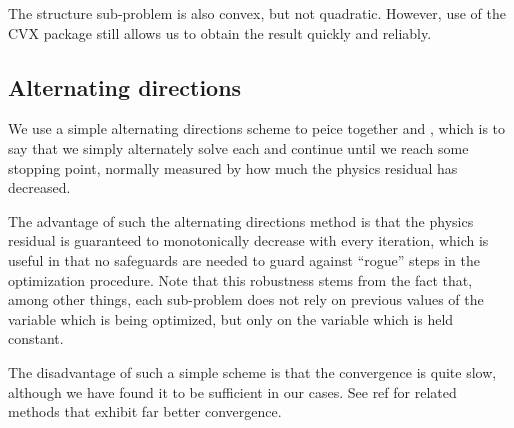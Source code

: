 The structure sub-problem is also convex, but not quadratic.
However, use of the CVX package still allows us to obtain the result
    quickly and reliably.

\subsection{Alternating directions}
We use a simple alternating directions scheme 
    to peice together  and ,
    which is to say that we simply
    alternately solve each and continue until we reach some stopping point,
    normally measured by how much the physics residual has decreased.

The advantage of such the alternating directions method
    is that the physics residual is guaranteed to
    monotonically decrease with every iteration,
    which is useful in that no safeguards
    are needed to guard against ``rogue'' steps
    in the optimization procedure.
Note that this robustness stems from the fact that,
    among other things,
    each sub-problem does not rely on previous values of 
    the variable which is being optimized,
    but only on the variable which is held constant.

The disadvantage of such a simple scheme is that 
    the convergence is quite slow,
    although we have found it to be sufficient in our cases.
See ref %
    for related methods that exhibit far better convergence.
